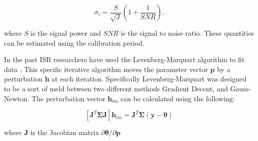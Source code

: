 \documentclass[10pt]{report}
\begin{document}
\begin{equation}
\label{sigpow}
\sigma_i = \frac{S}{\sqrt{J}}\left(1+\frac{1}{SNR}\right).
\end{equation}

\noindent where $S$ is the signal power and $SNR$ is the signal to noise ratio.  These quantities can be estimated using the calibration period.


In the past ISR researchers have used the Levenberg-Marquart algorithm to fit data \cite{nikoukar2008}.  This specific iterative algorithm moves the parameter vector $\mathbf{p}$ by a perturbation $\mathbf{h}$ at each iteration\cite{gavin:2013}.  Specifically Levenberg-Marquart was designed to be a sort of meld between two different methods Gradient Decent, and Gauss-Newton.  The perturbation vector $\mathbf{h}_{lm}$ can be calculated using the following:

\begin{equation}
\left[ \mathbf{J}^T\bm{\Sigma}\mathbf{J}\right]\mathbf{h}_{lm} =\mathbf{J}^T\bm{\Sigma}(\mathbf{y}-\bm{\theta})
\label{hlm}
\end{equation}

\noindent where $\mathbf{J}$ is the Jacobian matrix $\partial \bm{\theta}/\partial \mathbf{p}$ \cite{levenberg1944} \cite{marquardt:1963}


 

 

 
\end{document}
